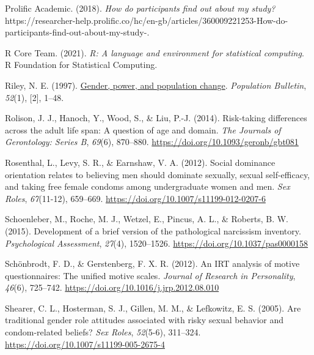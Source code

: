 \documentclass[
  donotrepeattitle,doc, 12pt, a4paper,floatsintext]{apa7}
\newlength{\cslhangindent}
\newlength{\cslentryspacingunit} %
\newenvironment{CSLReferences}[2] %
 {%
  \setlength{\parindent}{0pt}
  \ifodd #1
  \let\oldpar\par
  \def\par{\hangindent=\cslhangindent\oldpar}
  \fi
  \setlength{\parskip}{#2\cslentryspacingunit}
 }%
 {}
\begin{document}
\begin{CSLReferences}{1}{0}
\leavevmode{}%
Prolific Academic. (2018). \emph{How do participants find out about my study?} https://researcher-help.prolific.co/hc/en-gb/articles/360009221253-How-do-participants-find-out-about-my-study-.

\leavevmode{}%
R Core Team. (2021). \emph{R: A language and environment for statistical computing}. R Foundation for Statistical Computing.

\leavevmode{}%
Riley, N. E. (1997). \href{https://www.ncbi.nlm.nih.gov/pubmed/12320868}{Gender, power, and population change}. \emph{Population Bulletin}, \emph{52}(1), {[}2{]}, 1--48.

\leavevmode{}%
Rolison, J. J., Hanoch, Y., Wood, S., \& Liu, P.-J. (2014). Risk-taking differences across the adult life span: A question of age and domain. \emph{The Journals of Gerontology: Series B}, \emph{69}(6), 870--880. \url{https://doi.org/10.1093/geronb/gbt081}

\leavevmode{}%
Rosenthal, L., Levy, S. R., \& Earnshaw, V. A. (2012). Social dominance orientation relates to believing men should dominate sexually, sexual self-efficacy, and taking free female condoms among undergraduate women and men. \emph{Sex Roles}, \emph{67}(11-12), 659--669. \url{https://doi.org/10.1007/s11199-012-0207-6}

\leavevmode{}%
Schoenleber, M., Roche, M. J., Wetzel, E., Pincus, A. L., \& Roberts, B. W. (2015). Development of a brief version of the pathological narcissism inventory. \emph{Psychological Assessment}, \emph{27}(4), 1520--1526. \url{https://doi.org/10.1037/pas0000158}

\leavevmode{}%
Schönbrodt, F. D., \& Gerstenberg, F. X. R. (2012). An {IRT} analysis of motive questionnaires: The unified motive scales. \emph{Journal of Research in Personality}, \emph{46}(6), 725--742. \url{https://doi.org/10.1016/j.jrp.2012.08.010}

\leavevmode{}%
Shearer, C. L., Hosterman, S. J., Gillen, M. M., \& Lefkowitz, E. S. (2005). Are traditional gender role attitudes associated with risky sexual behavior and condom-related beliefs? \emph{Sex Roles}, \emph{52}(5-6), 311--324. \url{https://doi.org/10.1007/s11199-005-2675-4}


\end{CSLReferences}
\end{document}

